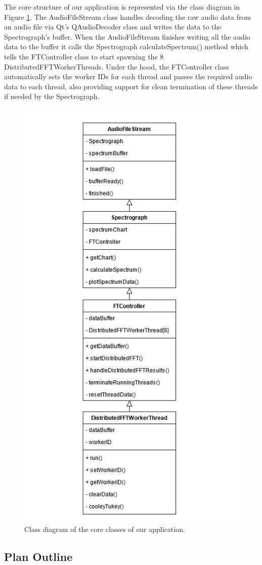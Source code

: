 \documentclass[journal]{IEEEtran}
\begin{document}
	\par{
		The core structure of our application is represented via the class
		diagram in Figure \ref{fig:class-diagram}. The AudioFileStream class
		handles decoding the raw audio data from an audio file via Qt's
		QAudioDecoder class and writes the data to the Spectrograph's buffer.
		When the AudioFileStream finishes writing all the audio data to the
		buffer it calls the Spectrograph calculateSpectrum() method which
		tells the FTController class to start spawning the 8
		DistributedFFTWorkerThreads. Under the hood, the FTController class
		automatically sets the worker IDs for each thread and passes the
		required audio data to each thread, also providing support for
		clean termination of these threads if needed by the Spectrograph.
	}

	\begin{figure}
		\centering
		\includegraphics[height=0.75\textwidth]{class-diagram}
		\caption{Class diagram of the core classes of our application.}
		\label{fig:class-diagram}
	\end{figure}

\subsection{Plan Outline}
\end{document}
